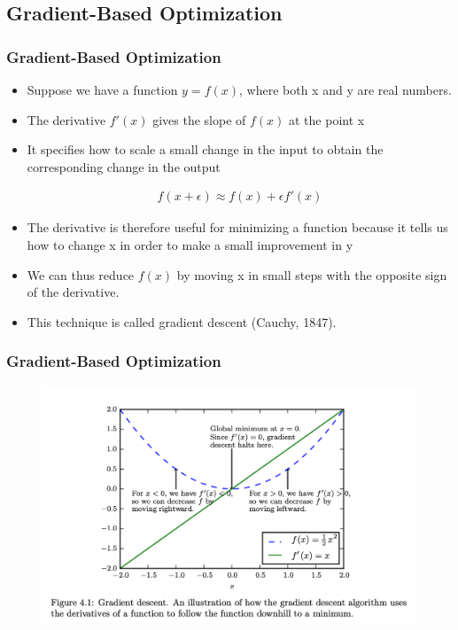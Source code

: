 \documentclass[
  shownotes,
  xcolor={svgnames},
  hyperref={colorlinks,citecolor=DarkBlue,linkcolor=DarkRed,urlcolor=DarkBlue}
  , aspectratio=169]{beamer}
\begin{document}
\subsection{Gradient-Based Optimization}
\begin{frame}[fragile]
\frametitle{Gradient-Based Optimization}


\begin{itemize}
\item Suppose we have a function $y=f(x)$, where both x and y are real numbers.

\item The derivative $f'(x)$ gives the slope of $f(x)$ at the point x
\item  It specifies how to scale a small change in the input to obtain the corresponding change in the output

\begin{align}
f(x+\epsilon)\approx f(x)+\epsilon f'(x)
\end{align}

\item The derivative is therefore useful for minimizing a function because it tells us how to change x
in order to make a small improvement in y
\item  We can thus reduce $f(x)$ by moving x in small steps with the opposite sign of the derivative.
\item This technique is called gradient descent (Cauchy, 1847).

\end{itemize}

\end{frame}
\begin{frame}[fragile]
\frametitle{Gradient-Based Optimization}



\begin{figure}[H] \centering
            \captionsetup{justification=centering}
              \includegraphics[scale=0.4]{figures/gradient_descent}
 \end{figure}
 \end{frame}
\end{document}
